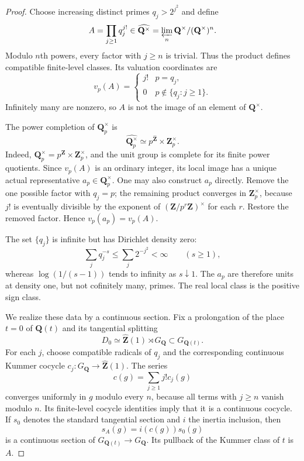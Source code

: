 \begin{proof}
Choose increasing distinct primes $q_j>2^{j^2}$ and define
\[
 A=\prod_{j\geq1}q_j^{j!}\in
 \widehat{\mathbf Q^\times}
 =\varprojlim_n\mathbf Q^\times/(\mathbf Q^\times)^n.
\]
Modulo $n$th powers, every factor with $j\geq n$ is trivial. Thus the
product defines compatible finite-level classes. Its valuation
coordinates are
\[
 v_p(A)=\begin{cases}j!&p=q_j,\\0&p\notin\{q_j:j\geq1\}.
 \end{cases}
\]
Infinitely many are nonzero, so $A$ is not the image of an element of
$\mathbf Q^\times$.

The power completion of $\mathbf Q_p^\times$ is
\[
 \widehat{\mathbf Q_p^\times}
 \simeq p^{\widehat{\mathbf Z}}\times\mathbf Z_p^\times.
\]
Indeed, $\mathbf Q_p^\times=p^{\mathbf Z}\times\mathbf Z_p^\times$,
and the unit group is complete for its finite power quotients. Since
$v_p(A)$ is an ordinary integer, its local image has a unique actual
representative $a_p\in\mathbf Q_p^\times$. One may also construct $a_p$
directly. Remove the one possible factor with $q_j=p$; the remaining
product converges in $\mathbf Z_p^\times$, because $j!$ is eventually
divisible by the exponent of $(\mathbf Z/p^r\mathbf Z)^\times$ for each
$r$. Restore the removed factor. Hence $v_p(a_p)=v_p(A)$.

The set $\{q_j\}$ is infinite but has Dirichlet density zero:
\[
 \sum_j q_j^{-s}\leq\sum_j2^{-j^2}<\infty\qquad(s\geq1),
\]
whereas $\log(1/(s-1))$ tends to infinity as $s\downarrow1$.
The $a_p$ are therefore units at density one, but not cofinitely many,
primes. The real local class is the positive sign class.

We realize these data by a continuous section. Fix a prolongation of
the place $t=0$ of $\mathbf Q(t)$ and its tangential splitting
\[
 D_0\simeq\widehat{\mathbf Z}(1)\rtimes G_{\mathbf Q}
 \subset G_{\mathbf Q(t)}.
\]
For each $j$, choose compatible radicals of $q_j$ and the corresponding
continuous Kummer cocycle
$c_j:G_{\mathbf Q}\to\widehat{\mathbf Z}(1)$. The series
\[
 c(g)=\sum_{j\geq1}j!c_j(g)
\]
converges uniformly in $g$ modulo every $n$, because all terms with
$j\geq n$ vanish modulo $n$. Its finite-level cocycle identities imply
that it is a continuous cocycle. If $s_0$ denotes the standard
tangential section and $i$ the inertia inclusion, then
\[
 s_A(g)=i(c(g))s_0(g)
\]
is a continuous section of $G_{\mathbf Q(t)}\to G_{\mathbf Q}$.
Its pullback of the Kummer class of $t$ is $A$.


\end{proof}
